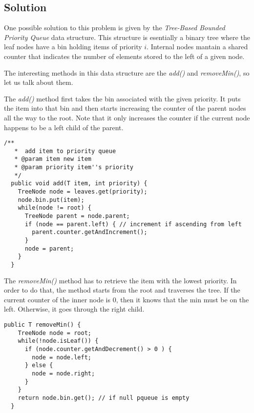 \subsection{Solution}
\par
One possible solution to this problem is given by the \textit{Tree-Based Bounded
Priority Queue} data structure. This structure is esentially a binary tree where
the leaf nodes have a bin holding items of priority $i$. Internal nodes mantain
a shared counter that indicates the number of elements stored to the left of
a given node.
\par
The interesting methods in this data structure are the \textit{add()} and
\textit{removeMin()}, so let us talk about them.
\par
The \textit{add()} method first takes the bin associated with the given
priority. It puts the item into that bin and then starts increasing the counter
of the parent nodes all the way to the root. Note that it only increases the
counter if the current node happens to be a left child of the parent.
\par
\hfill
\begin{lstlisting}[style=numbers]
  /**
   *  add item to priority queue
   * @param item new item
   * @param priority item''s priority
   */
  public void add(T item, int priority) {
    TreeNode node = leaves.get(priority);
    node.bin.put(item);
    while(node != root) {
      TreeNode parent = node.parent;
      if (node == parent.left) { // increment if ascending from left
        parent.counter.getAndIncrement();
      }
      node = parent;
    }
  }
\end{lstlisting}
\hfill
\par
The \textit{removeMin()} method has to retrieve the item with the lowest
priority. In order to do that, the method starts from the root and traverses the
tree. If the current counter of the inner node is $0$, then it knows that the
min must be on the left. Otherwise, it goes through the right child. 
\par
\hfill
\begin{lstlisting}[style=numbers]
  public T removeMin() {
    TreeNode node = root;
    while(!node.isLeaf()) {
      if (node.counter.getAndDecrement() > 0 ) {
        node = node.left;
      } else {
        node = node.right;
      }
    }
    return node.bin.get(); // if null pqueue is empty
  }
\end{lstlisting}
\hfill
\par
